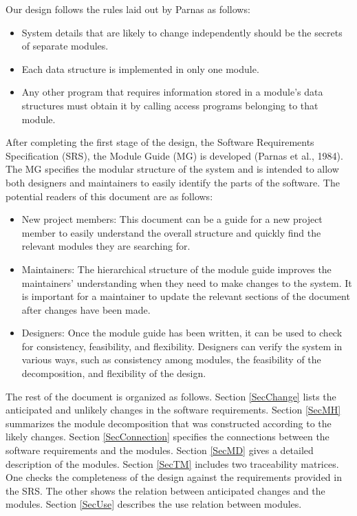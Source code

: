 \documentclass[12pt, titlepage]{article}
\begin{document}
Our design follows the rules laid out by Parnas as follows:
\begin{itemize}
\item System details that are likely to change independently should be the
  secrets of separate modules.
\item Each data structure is implemented in only one module.
\item Any other program that requires information stored in a module's data
  structures must obtain it by calling access programs belonging to that module.
\end{itemize}

After completing the first stage of the design, the Software Requirements
Specification (SRS), the Module Guide (MG) is developed (Parnas et al., 1984). The MG specifies the modular structure of the system and is intended to allow both designers and maintainers to easily identify the parts of the software.  The potential readers of this document are as follows:

\begin{itemize}
\item New project members: This document can be a guide for a new project member
  to easily understand the overall structure and quickly find the
  relevant modules they are searching for.
\item Maintainers: The hierarchical structure of the module guide improves the
  maintainers' understanding when they need to make changes to the system. It is
  important for a maintainer to update the relevant sections of the document
  after changes have been made.
\item Designers: Once the module guide has been written, it can be used to
  check for consistency, feasibility, and flexibility. Designers can verify the
  system in various ways, such as consistency among modules, the feasibility of the
  decomposition, and flexibility of the design.
\end{itemize}

The rest of the document is organized as follows. Section
\ref{SecChange} lists the anticipated and unlikely changes in the software
requirements. Section \ref{SecMH} summarizes the module decomposition that
was constructed according to the likely changes. Section \ref{SecConnection}
specifies the connections between the software requirements and the
modules. Section \ref{SecMD} gives a detailed description of the
modules. Section \ref{SecTM} includes two traceability matrices. One checks
the completeness of the design against the requirements provided in the SRS. The
other shows the relation between anticipated changes and the modules. Section
\ref{SecUse} describes the use relation between modules.
\end{document}
